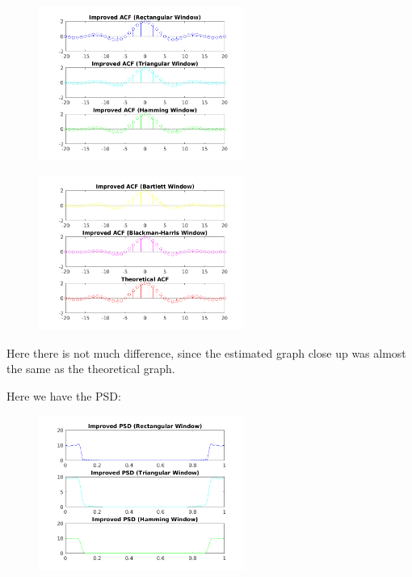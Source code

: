 \documentclass[a4paper,11pt]{article}
\begin{document}
\newpage

\begin{figure}[!hp]
    \begin{center}
      \includegraphics[width=0.6\textwidth]{images/study2/acf_hd_stem1.png}
    \end{center}
\end{figure}

\begin{figure}[!hp]
    \begin{center}
      \includegraphics[width=0.6\textwidth]{images/study2/acf_hd_stem2.png}
    \end{center}
\end{figure}

Here there is not much difference, since the estimated graph close up was
almost the same as the theoretical graph.

\newpage

Here we have the PSD:

\begin{figure}[!hp]
    \begin{center}
      \includegraphics[width=0.6\textwidth]{images/study2/psd_hd_window1.png}
    \end{center}
\end{figure}
\end{document}
